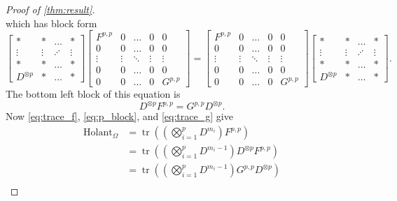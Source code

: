 \documentclass{article}
\theoremstyle{remark}
\theoremstyle{definition}
\DeclareMathOperator{\tr}{tr}
\DeclareMathOperator{\holant}{Holant}
\begin{document}
\begin{proof}[Proof of \autoref{thm:result}]
\[    \]
    which has block form
    \[
        \begin{bmatrix} 
            * & * & \ldots & *\\
            \vdots & \vdots & \iddots & \vdots\\
            * & * & \ldots & *\\
            D^{\otimes p} & * & \ldots & *
        \end{bmatrix}
        \begin{bmatrix} 
            F^{p,p} & 0 & \ldots & 0 & 0\\
            0 & 0 &\ldots & 0 & 0\\
            \vdots & \vdots & \ddots & \vdots & \vdots\\
            0 & 0 &\ldots & 0 & 0\\
            0 & 0 & \ldots & 0 & G^{p,p}
        \end{bmatrix}
        =
         \begin{bmatrix} 
            F^{p,p} & 0 & \ldots & 0 & 0\\
            0 & 0 &\ldots & 0 & 0\\
            \vdots & \vdots & \ddots & \vdots & \vdots\\
            0 & 0 &\ldots & 0 & 0\\
            0 & 0 & \ldots & 0 & G^{p,p}
        \end{bmatrix}           
        \begin{bmatrix} 
            * & * & \ldots & * \\
            \vdots & \vdots & \iddots & \vdots \\
            * & * & \ldots & *\\
            D^{\otimes p} & * & \ldots & *
        \end{bmatrix}.
    \]
    The bottom left block of this equation is
    \begin{equation}
        D^{\otimes p} F^{p,p} = G^{p,p} D^{\otimes p}.
        \label{eq:p_block}
    \end{equation}
    Now \eqref{eq:trace_f}, \eqref{eq:p_block}, and \eqref{eq:trace_g} give
    \begin{align*}
        \holant_{\Omega}
        &= \tr\left(\left(\bigotimes_{i=1}^p D^{m_i}\right) F^{p,p}\right) \\
        &= \tr\left(\left(\bigotimes_{i=1}^p D^{m_i-1}\right) D^{\otimes p}  F^{p,p}\right) \\
        &= \tr\left(\left(\bigotimes_{i=1}^p D^{m_i-1}\right) G^{p,p} D^{\otimes p}\right) \\

\end{align*}
\end{proof}
\end{document}
